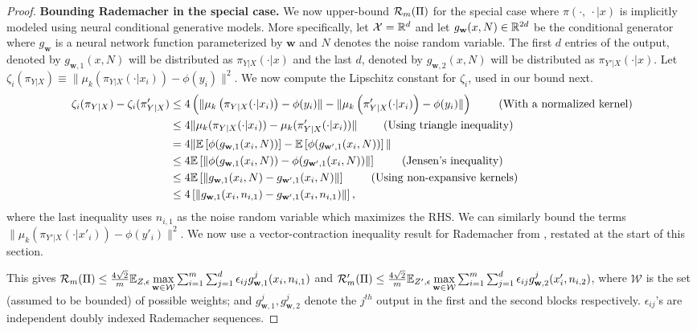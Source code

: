 \begin{proof}
\noindent\textbf{Bounding Rademacher in the special case.} We now upper-bound $\mathcal{R}_m(\Pi)$ for the special case where $\pi(\cdot, \ \cdot|x)$ is implicitly modeled using neural conditional generative models. More specifically, let $\mathcal{X}=\mathbb{R}^d$ and let $g_{\mathbf{w}}(x,N)\in\mathbb{R}^{2d}$ be the conditional generator where $g_{\mathbf{w}}$ is a neural network function parameterized by $\mathbf{w}$ and $N$ denotes the noise random variable. The first $d$ entries of the output, denoted by $g_{\mathbf{w},1}(x,N)$ will be distributed as $\pi_{Y|X}(\cdot|x)$ and the last $d$, denoted by $g_{\mathbf{w},2}(x,N)$ will be distributed as $\pi_{Y'|X}(\cdot|x)$. 
Let $\zeta_i(\pi_{Y|X})\equiv \|\mu_k(\pi_{Y|X}(\cdot|x_i)) - \phi(y_i)\|^2$. We now compute the Lipschitz constant for $\zeta_i$, used in our bound next. 
\begin{align}
    \zeta_i(\pi_{Y|X})-\zeta_i(\pi_{Y|X}') 
    & \leq 4\left( \|\mu_k\left(\pi_{Y|X}(\cdot|x_i)\right)-\phi(y_i)\| - \|\mu_k\left(\pi'_{Y|X}(\cdot|x_i)\right)-\phi(y_i) \| \right) \ \tag{With a normalized kernel}\nonumber\\
    &\leq  4\|\mu_k(\pi_{Y|X}(\cdot|x_i))-\mu_k(\pi'_{Y|X}(\cdot|x_i))\|\ \tag{Using triangle inequality} \nonumber \\
    & =4\|\E\left[\phi(g_{\mathbf{w},1}(x_i,N))\right]-\E\left[\phi(g_{\mathbf{w}',1}(x_i,N))\right]\|\nonumber\\
   & \le4\E\left[\|\phi(g_{\mathbf{w},1}(x_i,N))-\phi(g_{\mathbf{w}',1}(x_i,N))\|\right]\  \tag{Jensen's inequality}\nonumber\\
   & \le4\E\left[\|g_{\mathbf{w},1}(x_i,N)-g_{\mathbf{w}',1}(x_i,N)\|\right]\  \tag{Using non-expansive kernels}\nonumber\\
   & \le4\left[\|g_{\mathbf{w},1}(x_i,n_{i,1})-g_{\mathbf{w}',1}(x_i,n_{i,1})\|\right],
\end{align}
where the last inequality uses $n_{i, 1}$ as the noise random variable which maximizes the RHS. We can similarly bound the terms $\|\mu_k(\pi_{Y'|X}(\cdot|x'_i)) - \phi(y'_i)\|^2$.
We now use a vector-contraction inequality result for Rademacher from \cite{rad}, restated at the start of this section. 

This gives $\mathcal{R}_m(\Pi)\le\frac{4\sqrt{2}}{m}\mathbb{E}_{Z,\epsilon}\max\limits_{\mathbf{w}\in \mathcal{W}}\sum_{i=1}^m\sum_{j=1}^{d}\epsilon_{ij}g^j_{\mathbf{w},1}(x_i,n_{i,1})$ and 
\newline
$\mathcal{R}'_m(\Pi)\le\frac{4\sqrt{2}}{m}\mathbb{E}_{Z',\epsilon}\max\limits_{\mathbf{w}\in \mathcal{W}}\sum_{i=1}^m\sum_{j=1}^{d}\epsilon_{ij}g^j_{\mathbf{w},2}(x_i',n_{i,2})$, where $\mathcal{W}$ is the set (assumed to be bounded) of possible weights; and $g^j_{\mathbf{w},1}, g^j_{\mathbf{w},2}$ denote the $j^{th}$ output in the first and the second blocks respectively. $\epsilon_{ij}$'s are independent doubly indexed Rademacher sequences. 


\end{proof}
